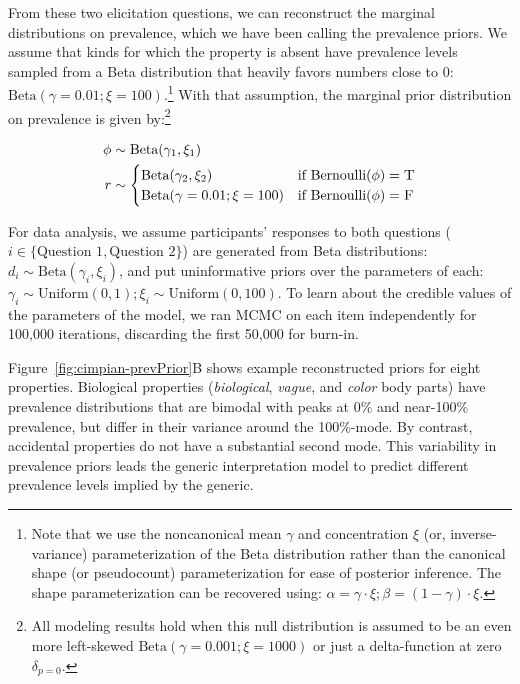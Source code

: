 \documentclass[floatsintext,man]{apa6}
\let\rmarkdownfootnote\footnote%
\def\footnote{\protect\rmarkdownfootnote}
\begin{document}
From these two elicitation questions, we can reconstruct the marginal distributions on prevalence, which we have been calling the prevalence priors.
We assume that kinds for which the
property is absent have prevalence levels sampled from a Beta
distribution that heavily favors numbers close to 0:
\(\text{Beta}(\gamma = 0.01; \xi = 100)\).\footnote{Note that we use the
  noncanonical mean \(\gamma\) and concentration \(\xi\) (or,
  inverse-variance) parameterization of the Beta distribution rather
  than the canonical shape (or pseudocount) parameterization for ease of
  posterior inference. The shape parameterization can be recovered
  using: \(\alpha = \gamma \cdot \xi; \beta = (1 - \gamma) \cdot \xi\).}
With that assumption, the marginal prior distribution on prevalence is given by:\footnote{All
  modeling results hold when this null distribution is assumed to be an
  even more left-skewed \(\text{Beta}(\gamma = 0.001; \xi = 1000)\) or
  just a delta-function at zero \(\delta_{p=0}\).}

\begin{align}
\phi & \sim \text{Beta}(\gamma_1, \xi_1) \nonumber \\ 
r & \sim \begin{cases}
        \text{Beta}(\gamma_2, \xi_2) &\mbox{if } \text{Bernoulli}(\phi) = \textsc{T} \label{eq:priorModel}  \\
        \text{Beta}(\gamma = 0.01; \xi = 100) &\mbox{if } \text{Bernoulli}(\phi) = \textsc{F} \\
        \end{cases}
\end{align}

For data analysis, we assume participants' responses to both questions
(\(i \in \{\text{Question 1}, \text{Question 2}\}\)) are generated from
Beta distributions: \(d_{i} \sim \text{Beta}(\gamma_i, \xi_i)\), and put
uninformative priors over the parameters of each:
\(\gamma_i \sim \text{Uniform}(0, 1); \xi_i \sim \text{Uniform}(0, 100)\).
To learn
about the credible values of the parameters of the model, we ran MCMC on
each item independently for 100,000 iterations, discarding the first
50,000 for burn-in.

Figure~\ref{fig:cimpian-prevPrior}B shows example reconstructed priors for eight properties.
Biological properties (\emph{biological}, \emph{vague}, and \emph{color}
body parts) have prevalence distributions that are bimodal with peaks at
0\% and near-100\% prevalence, but differ in their variance around the
100\%-mode. By contrast, accidental properties do not have a substantial
second mode. This variability in prevalence priors leads the generic
interpretation model to predict different prevalence levels implied by
the generic.
\end{document}

